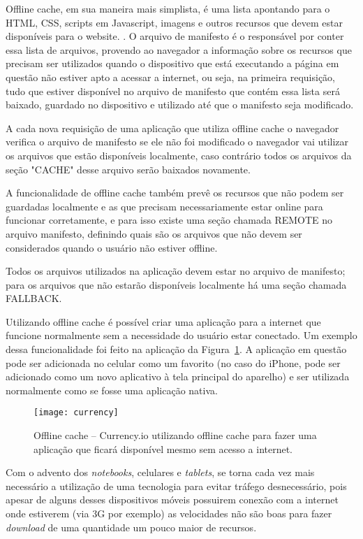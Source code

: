 Offline cache, em sua maneira mais simplista, é uma lista apontando
para o HTML, CSS, scripts em Javascript, imagens e outros recursos que devem
estar disponíveis para o website. \cite{pilgrim2010html5}. O arquivo de
manifesto é o responsável por conter essa lista de arquivos, provendo
ao navegador a informação sobre os recursos que
precisam ser utilizados quando o dispositivo que está executando a
página em questão não estiver apto a acessar a internet, ou seja,
na primeira requisição, tudo que estiver disponível no arquivo de manifesto
que contém essa lista será baixado, guardado no dispositivo e utilizado até
que o manifesto seja modificado.

A cada nova requisição de uma aplicação que utiliza offline cache o
navegador verifica o arquivo de manifesto se ele não foi modificado
o navegador vai utilizar os arquivos que estão disponíveis localmente,
caso contrário todos os arquivos da seção "CACHE" desse arquivo serão baixados novamente.

A funcionalidade de offline cache também prevê os recursos que não
podem ser guardadas localmente e as que precisam
necessariamente estar online para funcionar corretamente, e para isso
existe uma seção chamada REMOTE no arquivo manifesto, definindo quais
são os arquivos que não devem ser considerados quando o usuário não
estiver offline.

Todos os arquivos utilizados na aplicação devem estar no arquivo de
manifesto; para os arquivos que não estarão disponíveis localmente há
uma seção chamada FALLBACK.

Utilizando offline cache é possível criar uma aplicação para a
internet que funcione normalmente sem a necessidade do usuário estar
conectado. Um exemplo dessa funcionalidade foi feito na aplicação da
Figura~\ref{img:currency}. A aplicação em questão pode ser adicionada
no celular como um favorito (no caso do iPhone, pode ser adicionado
como um novo aplicativo à tela principal do aparelho) e ser utilizada
normalmente como se fosse uma aplicação nativa.

\begin{figure}[H]
  \centering
	\texttt{[image: currency]}
  \caption{Offline cache {--} Currency.io utilizando offline cache
  para fazer uma aplicação que ficará disponível mesmo sem acesso a
  internet.}
  \label{img:currency}
\end{figure}

Com o advento dos \textit{notebooks}, celulares e \textit{tablets},
se torna cada vez mais necessário a utilização de uma tecnologia para
evitar tráfego desnecessário, pois apesar
de alguns desses dispositivos móveis possuirem conexão com a internet
onde estiverem (via 3G por exemplo) as velocidades não são
boas para fazer \textit{download} de uma quantidade um pouco maior de
recursos.

